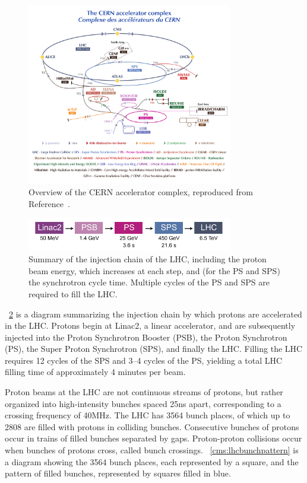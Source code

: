 \begin{figure}[p]
  \centering
  \includegraphics[width=0.8\textwidth]{figures/cms/LHCAcceleratorComplex.pdf}
  \caption[Overview of the CERN accelerator complex.]{Overview of the CERN accelerator complex, reproduced from Reference~\cite{Mobs:2636343}.}
  \label{cms:lhc}
\end{figure}

\begin{figure}[p]
  \centering
  \includegraphics[width=0.8\textwidth]{figures/cms/InjectionChain.pdf}
  \caption[Summary of the injection chain of the LHC.]{Summary of the injection chain of the LHC, including the proton beam energy, which increases at each step, and (for the PS and SPS) the synchrotron cycle time. Multiple cycles of the PS and SPS are required to fill the LHC.}
  \label{cms:injectionchain}
\end{figure}

\Fig~\ref{cms:injectionchain} is a diagram summarizing the injection chain by which protons are accelerated in the LHC.
Protons begin at Linac2, a linear accelerator, and are subsequently injected into the Proton Synchrotron Booster (PSB), the Proton Synchrotron (PS), the Super Proton Synchrotron (SPS), and finally the LHC.
Filling the LHC requires 12 cycles of the SPS and 3--4 cycles of the PS, yielding a total LHC filling time of approximately 4 minutes per beam.

Proton beams at the LHC are not continuous streams of protons, but rather organized into high-intensity bunches spaced 25\unit{ns} apart, corresponding to a crossing frequency of 40\unit{MHz}.
The LHC has 3564 bunch places, of which up to 2808 are filled with protons in colliding bunches.
Consecutive bunches of protons occur in trains of filled bunches separated by gaps.
Proton-proton collisions occur when bunches of protons cross, called bunch crossings.
\Fig~\ref{cms:lhcbunchpattern} is a diagram showing the 3564 bunch places, each represented by a square, and the pattern of filled bunches, represented by squares filled in blue.

